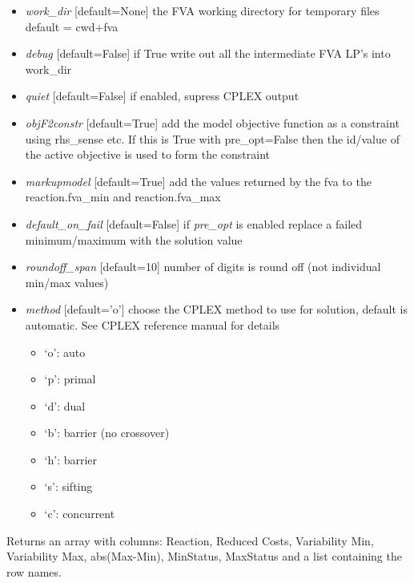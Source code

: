 \documentclass[a4paper,11pt,english]{sphinxmanual}
\begin{document}
\begin{fulllineitems}
\begin{itemize}
\item {} 
\emph{work\_dir} {[}default=None{]} the FVA working directory for temporary files default = cwd+fva

\item {} 
\emph{debug} {[}default=False{]} if True write out all the intermediate FVA LP's into work\_dir

\item {} 
\emph{quiet} {[}default=False{]} if enabled, supress CPLEX output

\item {} 
\emph{objF2constr} {[}default=True{]} add the model objective function as a constraint using rhs\_sense etc. If
this is True with pre\_opt=False then the id/value of the active objective is used to form the constraint

\item {} 
\emph{markupmodel} {[}default=True{]} add the values returned by the fva to the reaction.fva\_min and reaction.fva\_max

\item {} 
\emph{default\_on\_fail} {[}default=False{]} if \emph{pre\_opt} is enabled replace a failed minimum/maximum with the solution value

\item {} 
\emph{roundoff\_span} {[}default=10{]} number of digits is round off (not individual min/max values)

\item {} 
\emph{method} {[}default='o'{]} choose the CPLEX method to use for solution, default is automatic. See CPLEX reference manual for details
\begin{itemize}
\item {} 
`o': auto

\item {} 
`p': primal

\item {} 
`d': dual

\item {} 
`b': barrier (no crossover)

\item {} 
`h': barrier

\item {} 
`s': sifting

\item {} 
`c': concurrent

\end{itemize}

\end{itemize}

Returns an array with columns: Reaction, Reduced Costs, Variability Min, Variability Max, abs(Max-Min), MinStatus, MaxStatus and a list containing the row names.

\end{fulllineitems}
\end{document}
